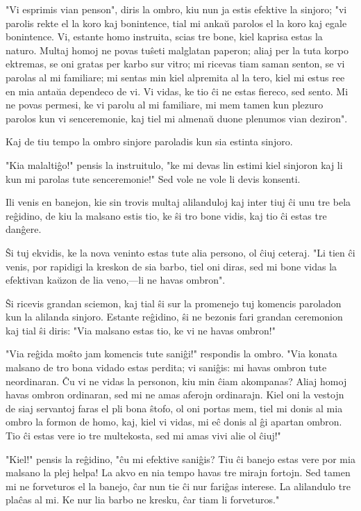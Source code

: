 "Vi esprimis vian penson", diris la ombro, kiu nun ja estis efektive la sinjoro; "vi parolis rekte el la koro kaj bonintence, tial mi ankaŭ parolos el la koro kaj egale bonintence. Vi, estante homo instruita, scias tre bone, kiel kaprisa estas la naturo. Multaj homoj ne povas tuŝeti malglatan paperon; aliaj per la tuta korpo ektremas, se oni gratas per karbo sur vitro; mi ricevas tiam saman senton, se vi parolas al mi familiare; mi sentas min kiel alpremita al la tero, kiel mi estus ree en mia antaŭa dependeco de vi. Vi vidas, ke tio ĉi ne estas fiereco, sed sento. Mi ne povas permesi, ke vi parolu al mi familiare, mi mem tamen kun plezuro parolos kun vi senceremonie, kaj tiel mi almenaŭ duone plenumos vian deziron".

Kaj de tiu tempo la ombro sinjore paroladis kun sia estinta sinjoro.

"Kia malaltiĝo!" pensis la instruitulo, "ke mi devas lin estimi kiel sinjoron kaj li kun mi parolas tute senceremonie!" Sed vole ne vole li devis konsenti.

Ili venis en banejon, kie sin trovis multaj alilanduloj kaj inter tiuj ĉi unu tre bela reĝidino, de kiu la malsano estis tio, ke ŝi tro bone vidis, kaj tio ĉi estas tre danĝere.

Ŝi tuj ekvidis, ke la nova veninto estas tute alia persono, ol ĉiuj ceteraj. "Li tien ĉi venis, por rapidigi la kreskon de sia barbo, tiel oni diras, sed mi bone vidas la efektivan kaŭzon de lia veno,---li ne havas ombron".

Ŝi ricevis grandan sciemon, kaj tial ŝi sur la promenejo tuj komencis paroladon kun la alilanda sinjoro. Estante reĝidino, ŝi ne bezonis fari grandan ceremonion kaj tial ŝi diris: "Via malsano estas tio, ke vi ne havas ombron!"

"Via reĝida moŝto jam komencis tute saniĝi!" respondis la ombro. "Via konata malsano de tro bona vidado estas perdita; vi saniĝis: mi havas ombron tute neordinaran. Ĉu vi ne vidas la personon, kiu min ĉiam akompanas? Aliaj homoj havas ombron ordinaran, sed mi ne amas aferojn ordinarajn. Kiel oni la vestojn de siaj servantoj faras el pli bona ŝtofo, ol oni portas mem, tiel mi donis al mia ombro la formon de homo, kaj, kiel vi vidas, mi eĉ donis al ĝi apartan ombron. Tio ĉi estas vere io tre multekosta, sed mi amas vivi alie ol ĉiuj!"

"Kiel!" pensis la reĝidino, "ĉu mi efektive saniĝis? Tiu ĉi banejo estas vere por mia malsano la plej helpa! La akvo en nia tempo havas tre mirajn fortojn. Sed tamen mi ne forveturos el la banejo, ĉar nun tie ĉi nur fariĝas interese. La alilandulo tre plaĉas al mi. Ke nur lia barbo ne kresku, ĉar tiam li forveturos."

